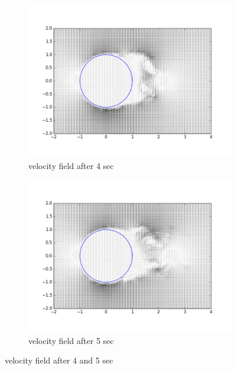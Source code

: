 \documentclass[a4paper,11pt]{article}
\begin{document}
\begin{figure}[ht]
  \centering
  \begin{subfigure}[ht]{.5\textwidth}
      \centering
      \includegraphics[width=.8\linewidth]{qui_4.png}
      \caption{velocity field after 4 sec}
      \label{fig:361}
  \end{subfigure}
  \begin{subfigure}[ht]{.5\textwidth}
      \centering
      \includegraphics[width=.8\linewidth]{qui_5.png}
      \caption{velocity field after 5 sec}
      \label{fig:491}
  \end{subfigure}%
  \label{fig:Question 1a1}
  \caption{velocity field after 4 and 5 sec}
\end{figure}
\end{document}
